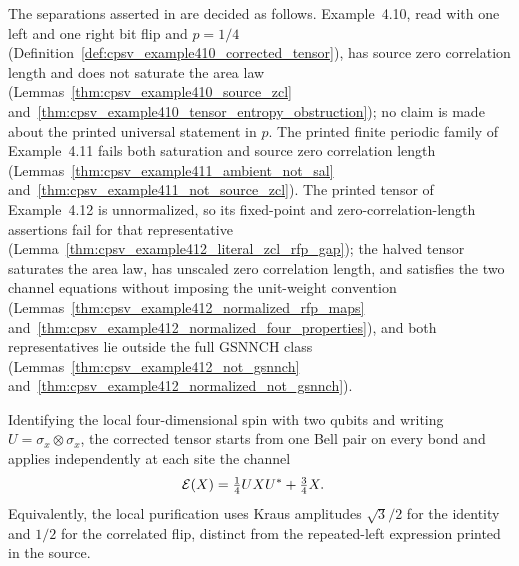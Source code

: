 \begin{remark}
    \label{thm:cpsv_examples410_412_status}
    The separations asserted in
    \cite[Examples~4.10--4.12, lines~897--942]{Cirac2016MPDO_arXiv} are decided
    as follows.  Example~4.10, read with one left and one right bit flip and
    $p=1/4$ (Definition~\ref{def:cpsv_example410_corrected_tensor}), has source
    zero correlation length and does not saturate the area law
    (Lemmas~\ref{thm:cpsv_example410_source_zcl}
    and~\ref{thm:cpsv_example410_tensor_entropy_obstruction}); no claim is made
    about the printed universal statement in $p$.  The printed finite periodic
    family of Example~4.11 fails both saturation and source zero correlation
    length (Lemmas~\ref{thm:cpsv_example411_ambient_not_sal}
    and~\ref{thm:cpsv_example411_not_source_zcl}).  The printed tensor of
    Example~4.12 is unnormalized, so its fixed-point and zero-correlation-length
    assertions fail for that representative
    (Lemma~\ref{thm:cpsv_example412_literal_zcl_rfp_gap}); the halved tensor
    saturates the area law, has unscaled zero correlation length, and
    satisfies the two channel equations without imposing the unit-weight
    convention
    (Lemmas~\ref{thm:cpsv_example412_normalized_rfp_maps}
    and~\ref{thm:cpsv_example412_normalized_four_properties}), and both
    representatives lie outside the full GSNNCH class
    (Lemmas~\ref{thm:cpsv_example412_not_gsnnch}
    and~\ref{thm:cpsv_example412_normalized_not_gsnnch}).
\end{remark}

\begin{definition}
    \label{def:cpsv_example410_corrected_tensor}
    \leanok
    Identifying the local four-dimensional spin with two qubits and writing
    $U=\sigma_x\otimes\sigma_x$, the corrected tensor starts from one Bell pair on every bond and
    applies independently at each site the channel
    \begin{align}
        \mathcal E(X) & =\tfrac14 UXU^*+\tfrac34X. \notag
    \end{align}
    Equivalently, the local purification uses Kraus amplitudes
    $\sqrt3/2$ for the identity and $1/2$ for the correlated flip,
    distinct from the repeated-left expression printed in the source.
\end{definition}

